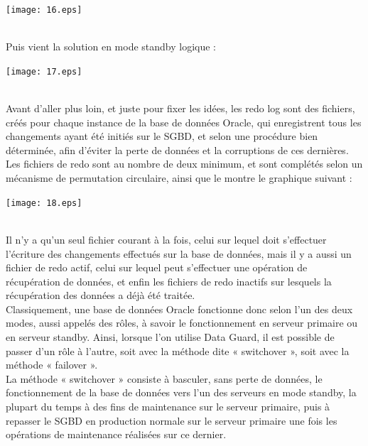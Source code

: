 \documentclass[12pt]{report}
\begin{document}
\begin{center}
  \texttt{[image: 16.eps]}
\end{center}\\

Puis vient la solution en mode standby logique : \\

\begin{center}
  \texttt{[image: 17.eps]}
\end{center}\\

Avant d'aller plus loin, et juste pour fixer les idées, les redo log sont des
fichiers, créés pour chaque instance de la base de données Oracle, qui
enregistrent tous les changements ayant été initiés sur le SGBD, et selon une
procédure bien déterminée, afin d'éviter la perte de données et la corruptions
de ces dernières. \\

Les fichiers de redo sont au nombre de deux minimum, et sont complétés selon un
mécanisme de permutation circulaire, ainsi que le montre le graphique suivant : \\

\begin{center}
  \texttt{[image: 18.eps]}
\end{center}\\

Il n'y a qu'un seul fichier courant à la fois, celui sur lequel doit s'effectuer
l'écriture des changements effectués sur la base de données, mais il y a aussi
un fichier de redo actif, celui sur lequel peut s'effectuer une opération de
récupération de données, et enfin les fichiers de redo inactifs sur lesquels la
récupération des données a déjà été traitée. \\

Classiquement, une base de données Oracle fonctionne donc selon l'un des deux
modes, aussi appelés des rôles, à savoir le fonctionnement en serveur primaire
ou en serveur standby. Ainsi, lorsque l'on utilise Data Guard, il est possible
de passer d'un rôle à l'autre, soit avec la méthode dite « switchover », soit
avec la méthode « failover ». \\

La méthode « switchover » consiste à basculer, sans perte de données, le
fonctionnement de la base de données vers l'un des serveurs en mode standby, la
plupart du temps à des fins de maintenance sur le serveur primaire, puis à
repasser le SGBD en production normale sur le serveur primaire une fois les
opérations de maintenance réalisées sur ce dernier. \\
\end{document}
